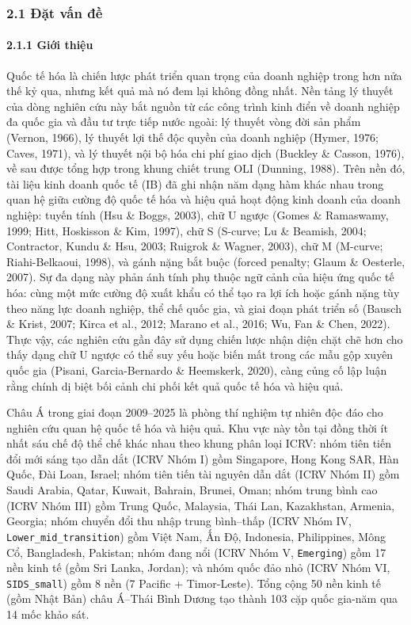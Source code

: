 \documentclass[
  a4paper,
  13pt]{extreport}
\begin{document}
\hypertarget{ux111ux1eb7t-vux1ea5n-ux111ux1ec1}{%
\subsubsection{2.1 Đặt vấn đề}\label{ux111ux1eb7t-vux1ea5n-ux111ux1ec1}}

\hypertarget{giux1edbi-thiux1ec7u}{%
\paragraph{2.1.1 Giới thiệu}\label{giux1edbi-thiux1ec7u}}

Quốc tế hóa là chiến lược phát triển quan trọng của doanh nghiệp trong
hơn nửa thế kỷ qua, nhưng kết quả mà nó đem lại không đồng nhất. Nền
tảng lý thuyết của dòng nghiên cứu này bắt nguồn từ các công trình kinh
điển về doanh nghiệp đa quốc gia và đầu tư trực tiếp nước ngoài: lý
thuyết vòng đời sản phẩm (Vernon, 1966), lý thuyết lợi thế độc quyền của
doanh nghiệp (Hymer, 1976; Caves, 1971), và lý thuyết nội bộ hóa chi phí
giao dịch (Buckley \& Casson, 1976), về sau được tổng hợp trong khung
chiết trung OLI (Dunning, 1988). Trên nền đó, tài liệu kinh doanh quốc
tế (IB) đã ghi nhận năm dạng hàm khác nhau trong quan hệ giữa cường độ
quốc tế hóa và hiệu quả hoạt động kinh doanh của doanh nghiệp: tuyến
tính (Hsu \& Boggs, 2003), chữ U ngược (Gomes \& Ramaswamy, 1999; Hitt,
Hoskisson \& Kim, 1997), chữ S (S-curve; Lu \& Beamish, 2004;
Contractor, Kundu \& Hsu, 2003; Ruigrok \& Wagner, 2003), chữ M
(M-curve; Riahi-Belkaoui, 1998), và gánh nặng bắt buộc (forced penalty;
Glaum \& Oesterle, 2007). Sự đa dạng này phản ánh tính phụ thuộc ngữ
cảnh của hiệu ứng quốc tế hóa: cùng một mức cường độ xuất khẩu có thể
tạo ra lợi ích hoặc gánh nặng tùy theo năng lực doanh nghiệp, thể chế
quốc gia, và giai đoạn phát triển số (Bausch \& Krist, 2007; Kirca et
al., 2012; Marano et al., 2016; Wu, Fan \& Chen, 2022). Thực vậy, các
nghiên cứu gần đây sử dụng chiến lược nhận diện chặt chẽ hơn cho thấy
dạng chữ U ngược có thể suy yếu hoặc biến mất trong các mẫu gộp xuyên
quốc gia (Pisani, Garcia-Bernardo \& Heemskerk, 2020), càng củng cố lập
luận rằng chính dị biệt bối cảnh chi phối kết quả quốc tế hóa và hiệu
quả.

Châu Á trong giai đoạn 2009--2025 là phòng thí nghiệm tự nhiên độc đáo
cho nghiên cứu quan hệ quốc tế hóa và hiệu quả. Khu vực này tồn tại đồng
thời ít nhất sáu chế độ thể chế khác nhau theo khung phân loại ICRV:
nhóm tiên tiến đổi mới sáng tạo dẫn dắt (ICRV Nhóm I) gồm Singapore,
Hong Kong SAR, Hàn Quốc, Đài Loan, Israel; nhóm tiên tiến tài nguyên dẫn
dắt (ICRV Nhóm II) gồm Saudi Arabia, Qatar, Kuwait, Bahrain, Brunei,
Oman; nhóm trung bình cao (ICRV Nhóm III) gồm Trung Quốc, Malaysia, Thái
Lan, Kazakhstan, Armenia, Georgia; nhóm chuyển đổi thu nhập trung
bình--thấp (ICRV Nhóm IV, \texttt{Lower\_mid\_transition}) gồm Việt Nam,
Ấn Độ, Indonesia, Philippines, Mông Cổ, Bangladesh, Pakistan; nhóm đang
nổi (ICRV Nhóm V, \texttt{Emerging}) gồm 17 nền kinh tế (gồm Sri Lanka,
Jordan); và nhóm quốc đảo nhỏ (ICRV Nhóm VI, \texttt{SIDS\_small}) gồm 8
nền (7 Pacific + Timor-Leste). Tổng cộng 50 nền kinh tế (gồm Nhật Bản)
châu Á--Thái Bình Dương tạo thành 103 cặp quốc gia-năm qua 14 mốc khảo
sát.
\end{document}
